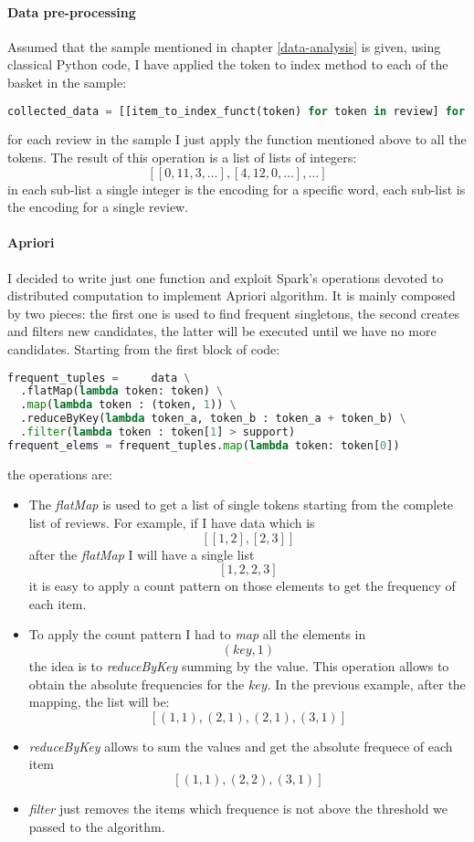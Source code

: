 \paragraph{Data pre-processing} Assumed that the sample mentioned in chapter \ref{data-analysis} is given, using classical Python code, I have applied the token to index method to each of the basket in the sample:
\begin{lstlisting}[language=Python]
  collected_data = [[item_to_index_funct(token) for token in review] for review in collected_data]
\end{lstlisting}
for each review in the sample I just apply the function mentioned above to all the tokens. The result of this operation is a list of lists of integers:
$$
[[0,11,3,\dots],[4,12,0,\dots],\dots]
$$
in each sub-list a single integer is the encoding for a specific word, each sub-list is the encoding for a single review.

\paragraph{Apriori} I decided to write just one function and exploit Spark's operations devoted to distributed computation to implement Apriori algorithm. It is mainly composed by two pieces: the first one is used to find frequent singletons, the second creates and filters new candidates, the latter will be executed until we have no more candidates. Starting from the first block of code:
\begin{lstlisting}[language=Python]
frequent_tuples =     data \
  .flatMap(lambda token: token) \
  .map(lambda token : (token, 1)) \
  .reduceByKey(lambda token_a, token_b : token_a + token_b) \
  .filter(lambda token : token[1] > support)
frequent_elems = frequent_tuples.map(lambda token: token[0])
\end{lstlisting}
the operations are:
\begin{itemize}
  \item The \textit{flatMap} is used to get a list of single tokens starting from the complete list of reviews. For example, if I have data which is 
  $$
  [[1,2],[2,3]]
  $$
  after the \textit{flatMap} I will have a single list
  $$
  [1,2,2,3]
  $$
  it is easy to apply a count pattern on those elements to get the frequency of each item.
  \item To apply the count pattern I had to \textit{map} all the elements in
  $$
  (key,1)
  $$
  the idea is to \textit{reduceByKey} summing by the value. This operation allows to obtain the absolute frequencies for the $key$. In the previous example, after the mapping, the list will be:
  $$
  [(1,1),(2,1),(2,1),(3,1)]
  $$
  \item \textit{reduceByKey} allows to sum the values and get the absolute frequece of each item
  $$
  [(1,1),(2,2),(3,1)]
  $$
  \item \textit{filter} just removes the items which frequence is not above the threshold we passed to the algorithm.
\end{itemize}

